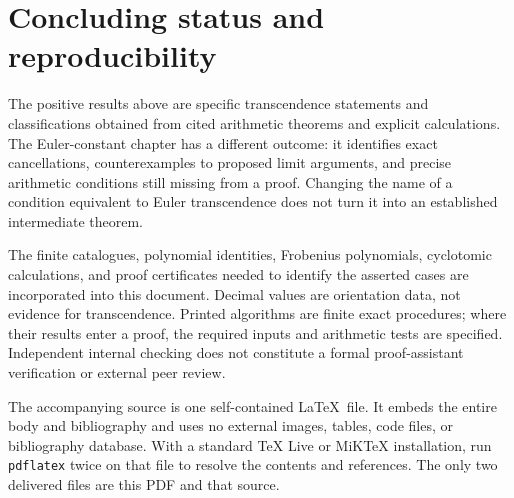 \documentclass[11pt,a4paper]{article}
\theoremstyle{definition}
\theoremstyle{remark}
\numberwithin{equation}{section}
\begin{document}
\section{Concluding status and reproducibility}
The positive results above are specific transcendence statements and
classifications obtained from cited arithmetic theorems and explicit
calculations. The Euler-constant chapter has a different outcome: it
identifies exact cancellations, counterexamples to proposed limit arguments,
and precise arithmetic conditions still missing from a proof.
Changing the name of a condition equivalent to Euler transcendence does
not turn it into an established intermediate theorem.

The finite catalogues, polynomial identities, Frobenius polynomials,
cyclotomic calculations, and proof certificates needed to identify the
asserted cases are incorporated into this document. Decimal values are
orientation data, not evidence for transcendence. Printed algorithms are
finite exact procedures; where their results enter a proof, the required
inputs and arithmetic tests are specified. Independent internal checking
does not constitute a formal proof-assistant verification or external peer
review.

The accompanying source is one self-contained \LaTeX\ file. It embeds the
entire body and bibliography and uses no external images, tables, code files,
or bibliography database. With a standard TeX Live or MiKTeX installation,
run \texttt{pdflatex} twice on that file to resolve the contents and references.
The only two delivered files are this PDF and that source.
\end{document}
